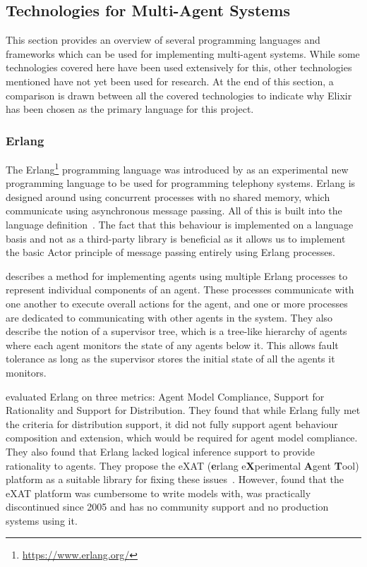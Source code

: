 \subsection{Technologies for Multi-Agent Systems}

This section provides an overview of several programming languages and frameworks which can be used for implementing multi-agent systems.
While some technologies covered here have been used extensively for this, other technologies mentioned have not yet been used for research.
At the end of this section, a comparison is drawn between all the covered technologies to indicate why Elixir has been chosen as the primary language for this project.

\subsubsection{Erlang}

The Erlang\footnote{\url{https://www.erlang.org/}} programming language was introduced by  as an experimental new programming language to be used for programming telephony systems.
Erlang is designed around using concurrent processes with no shared memory, which communicate using asynchronous message passing.
All of this is built into the language definition~\cite{armstrong2007history}.
The fact that this behaviour is implemented on a language basis and not as a third-party library is beneficial as it allows us to implement the basic Actor principle of message passing entirely using Erlang processes.

 describes a method for implementing agents using multiple Erlang processes to represent individual components of an agent.
These processes communicate with one another to execute overall actions for the agent, and one or more processes are dedicated to communicating with other agents in the system.
They also describe the notion of a supervisor tree, which is a tree-like hierarchy of agents where each agent monitors the state of any agents below it.
This allows fault tolerance as long as the supervisor stores the initial state of all the agents it monitors.

 evaluated Erlang on three metrics: Agent Model Compliance, Support for Rationality and Support for Distribution.
They found that while Erlang fully met the criteria for distribution support, it did not fully support agent behaviour composition and extension, which would be required for agent model compliance.
They also found that Erlang lacked logical inference support to provide rationality to agents.
They propose the eXAT (\textbf{e}rlang e\textbf{X}perimental \textbf{A}gent \textbf{T}ool) platform as a suitable library for fixing these issues~\cite{distefano2003exat}.
However,  found that the eXAT platform was cumbersome to write models with, was practically discontinued since 2005 and has no community support and no production systems using it.


